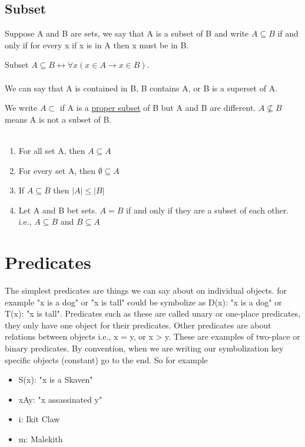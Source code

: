 \documentclass[../MATH-2000-Notes.tex]{subfiles}
\begin{document}
\subsection{Subset}
Suppose A and B are sets, we say that A is a subset of B and write \(A \subseteq B\) if and only if for every x if x is in A then x must be in B. 
\begin{Definition}
    {Subset}
    \(A \subseteq B \leftrightarrow \forall x (x\in A \rightarrow x\in B)\).
    \\~\\
    We can say that A is contained in B, B contains A, or B is a superset of A.
\end{Definition}
\begin{Note}
    We write \(A\subset\) if A is a \underline{proper subset} of B but A and B are different. \(A \not\subseteq B\) means A is not a subset of B.
    \\~\\
    \begin{enumerate}
        \item For all set A, then \(A\subseteq A\)
        \item For every set A, then \(\emptyset \subseteq A\)
        \item If \(A\subseteq B\) then \(|A| \leq |B|\)
        \item Let A and B bet sets. \(A = B\) if and only if they are a subset of each other. i.e., \(A\subseteq B\) and \(B \subseteq A\) 
    \end{enumerate}
\end{Note}

\section{Predicates}
The simplest predicates are things we can say about on individual objects. for example "x is a dog" or "x is tall" could be symbolize as D(x): "x is a dog" or T(x): "x is tall". Predicates such as these are called unary or one-place predicates, they only have one object for their predicates. Other predicates are about relations between objects i.e., x = y, or x > y. These are examples of two-place or binary predicates. By convention, when we are writing our symbolization key specific objects (constant) go to the end. So for example
\begin{itemize}
    \item S(x): "x is a Skaven"
    \item xAy: "x assassinated y"
    \item i: Ikit Claw
    \item m: Malekith
\end{itemize} 
\end{document}
